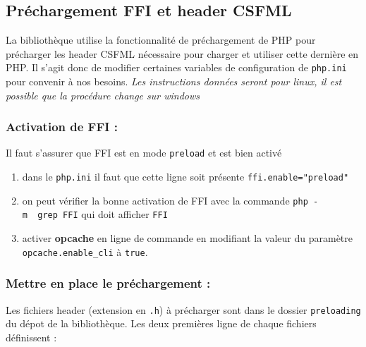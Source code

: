 \documentclass[11pt,a4paper,krantz2,11pt,oneside]{krantz}
\begin{document}
\hypertarget{pruxe9chargement-ffi-et-header-csfml}{%
\subsection{Préchargement FFI et header CSFML}\label{pruxe9chargement-ffi-et-header-csfml}}

La bibliothèque utilise la fonctionnalité de préchargement de PHP pour précharger les header CSFML nécessaire pour charger et utiliser cette dernière en PHP. Il s'agit donc de modifier certaines variables de configuration de \texttt{php.ini} pour convenir à nos besoins. \emph{Les instructions données seront pour linux, il est possible que la procédure change sur windows}

\hypertarget{activation-de-ffi}{%
\subsubsection{Activation de FFI :}\label{activation-de-ffi}}

Il faut s'assurer que FFI est en mode \texttt{preload} et est bien activé

\begin{enumerate}
\def\labelenumi{\arabic{enumi}.}
\item
  dans le \texttt{php.ini} il faut que cette ligne soit présente \texttt{ffi.enable="preload"}
\item
  on peut vérifier la bonne activation de FFI avec la commande \texttt{php\ -m\ \textbar{}\ grep\ FFI} qui doit afficher \texttt{FFI}
\item
  activer \textbf{opcache} en ligne de commande en modifiant la valeur du paramètre \texttt{opcache.enable\_cli} à \texttt{true}.
\end{enumerate}

\hypertarget{mettre-en-place-le-pruxe9chargement}{%
\subsubsection{Mettre en place le préchargement :}\label{mettre-en-place-le-pruxe9chargement}}

Les fichiers header (extension en \texttt{.h}) à précharger sont dans le dossier \texttt{preloading} du dépot de la bibliothèque. Les deux premières ligne de chaque fichiers définissent :
\end{document}
